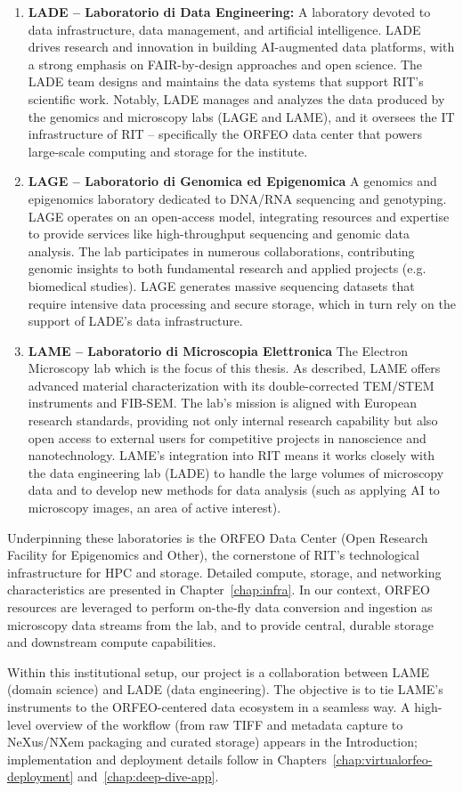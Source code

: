 \begin{enumerate}
	\item \textbf{LADE – Laboratorio di Data Engineering:}
	A laboratory devoted to data infrastructure, data management, and artificial intelligence. LADE drives research and innovation in building AI-augmented data platforms, with a strong emphasis on FAIR-by-design approaches and open science. The LADE team designs and maintains the data systems that support RIT’s scientific work. Notably, LADE manages and analyzes the data produced by the genomics and microscopy labs (LAGE and LAME), and it oversees the IT infrastructure of RIT – specifically the ORFEO data center that powers large-scale computing and storage for the institute.
	
	\item \textbf{LAGE – Laboratorio di Genomica ed Epigenomica}
	A genomics and epigenomics laboratory dedicated to DNA/RNA sequencing and genotyping. LAGE operates on an open-access model, integrating resources and expertise to provide services like high-throughput sequencing and genomic data analysis. The lab participates in numerous collaborations, contributing genomic insights to both fundamental research and applied projects (e.g. biomedical studies). LAGE generates massive sequencing datasets that require intensive data processing and secure storage, which in turn rely on the support of LADE’s data infrastructure.
	
	\item \textbf{LAME – Laboratorio di Microscopia Elettronica}
	The Electron Microscopy lab which is the focus of this thesis. As described, LAME offers advanced material characterization with its double-corrected TEM/STEM instruments and FIB-SEM. The lab’s mission is aligned with European research standards, providing not only internal research capability but also open access to external users for competitive projects in nanoscience and nanotechnology. LAME’s integration into RIT means it works closely with the data engineering lab (LADE) to handle the large volumes of microscopy data and to develop new methods for data analysis (such as applying AI to microscopy images, an area of active interest).
\end{enumerate}

\noindent Underpinning these laboratories is the ORFEO Data Center (Open Research Facility for Epigenomics and Other), the cornerstone of RIT’s technological infrastructure for HPC and storage. Detailed compute, storage, and networking characteristics are presented in Chapter~\ref{chap:infra}. In our context, ORFEO resources are leveraged to perform on-the-fly data conversion and ingestion as microscopy data streams from the lab, and to provide central, durable storage and downstream compute capabilities.

\medskip
\noindent Within this institutional setup, our project is a collaboration between LAME (domain science) and LADE (data engineering). The objective is to tie LAME’s instruments to the ORFEO-centered data ecosystem in a seamless way. A high-level overview of the workflow (from raw TIFF and metadata capture to NeXus/NXem packaging and curated storage) appears in the Introduction; implementation and deployment details follow in Chapters~\ref{chap:virtualorfeo-deployment} and~\ref{chap:deep-dive-app}.
